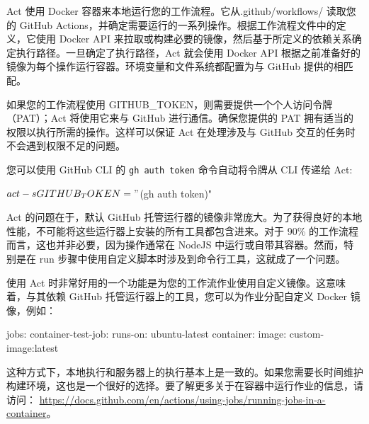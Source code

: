 
Act 使用 Docker 容器来本地运行您的工作流程。它从.github/workflows/ 读取您的 GitHub Actions，并确定需要运行的一系列操作。根据工作流程文件中的定义，它使用 Docker API 来拉取或构建必要的镜像，然后基于所定义的依赖关系确定执行路径。一旦确定了执行路径，Act 就会使用 Docker API 根据之前准备好的镜像为每个操作运行容器。环境变量和文件系统都配置为与 GitHub 提供的相匹配。

如果您的工作流程使用 GITHUB\_TOKEN，则需要提供一个个人访问令牌（PAT）；Act 将使用它来与 GitHub 进行通信。确保您提供的 PAT 拥有适当的权限以执行所需的操作。这样可以保证 Act 在处理涉及与 GitHub 交互的任务时不会遇到权限不足的问题。


您可以使用 GitHub CLI 的 \verb|gh auth token| 命令自动将令牌从 CLI 传递给 Act:

\begin{shell}
$ act -s GITHUB_TOKEN="$(gh auth token)"
\end{shell}


Act 的问题在于，默认 GitHub 托管运行器的镜像非常庞大。为了获得良好的本地性能，不可能将这些运行器上安装的所有工具都包含进来。对于 90\% 的工作流程而言，这也并非必要，因为操作通常在 NodeJS 中运行或自带其容器。然而，特别是在 run 步骤中使用自定义脚本时涉及到命令行工具，这就成了一个问题。

使用 Act 时非常好用的一个功能是为您的工作流作业使用自定义镜像。这意味着，与其依赖 GitHub 托管运行器上的工具，您可以为作业分配自定义 Docker 镜像，例如：

\begin{shell}
jobs:
  container-test-job:
    runs-on: ubuntu-latest
    container:
      image: custom-image:latest
\end{shell}

这种方式下，本地执行和服务器上的执行基本上是一致的。如果您需要长时间维护构建环境，这也是一个很好的选择。要了解更多关于在容器中运行作业的信息，请访问： \url{https://docs.github.com/en/actions/using-jobs/running-jobs-in-a-container}。